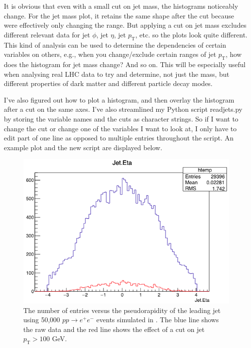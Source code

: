 It is obvious that even with a small cut on jet mass, the histograms noticeably change. For the jet mass plot, it retains the same shape after the cut because were effectively only changing the range. But applying a cut on jet mass excludes different relevant data for jet $\phi$, jet $\eta$, jet $p_{\mathrm{T}}$, etc. so the plots look quite different. This kind of analysis can be used to determine the dependencies of certain variables on others, e.g., when you change/exclude certain ranges of jet $p_{\mathrm{T}}$, how does the histogram for jet mass change? And so on. This will be especially useful when analysing real LHC data to try and determine, not just the mass, but different properties of dark matter and different particle decay modes.

I've also figured out how to plot a histogram, and then overlay the histogram after a cut on the same axes. I've also streamlined my Python script readjets.py by storing the variable names and the cuts as character strings. So if I want to change the cut or change one of the variables I want to look at, I only have to edit part of one line as opposed to multiple entries throughout the script. An example plot and the new script are displayed below.

\begin{figure}[H]
\centering
\includegraphics[width=\textwidth]{./sec10/JetEtalargecut.png}
\caption{The number of entries versus the pseudorapidity of the leading jet using 50,000 $pp \rightarrow e^+ e^-$ events simulated in \madgraph. The blue line shows the raw data and the red line shows the effect of a cut on jet $p_{\mathrm{T}} > 100$ GeV.}
\end{figure}


